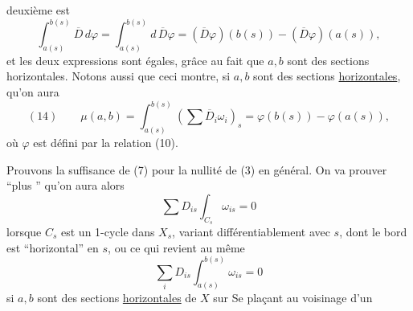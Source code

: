 deuxième est
\[
\int_{a(s)}^{b(s)}\overline D\,d\varphi=\int_{a(s)}^{b(s)}d\,\overline D\varphi=(\overline D\varphi)(b(s))-(\overline D\varphi)(a(s)),
\]
 et les deux expressions sont égales, grâce au fait que $a,b$ sont des sections horizontales. Notons aussi que ceci montre, si $a,b$ sont des sections \uline{horizontales}, qu'on aura
\[
(14)\qquad \mu(a,b)=\int_{a(s)}^{b(s)}\left(\sum\overline D_i\omega_i\right)_s=\varphi(b(s))-\varphi(a(s)),
\]
où $\varphi$ est défini par la relation (10).

Prouvons la suffisance de (7) pour la nullité de (3) en général. On va prouver ``plus '' qu'on aura alors
\[
\sum D_{is}\int_{C_s}\omega_{is}=0
\]
lorsque $C_s$ est un 1-cycle dans $X_s$, variant différentiablement avec $s$, dont le bord est ``horizontal'' en $s$, ou ce qui revient au même
\[
\sum_i D_{is}\int_{a(s)}^{b(s)}\omega_{is}=0
\]
si $a,b$ sont des sections \uline{horizontales} de $X$ sur    Se plaçant au voisinage d'un
